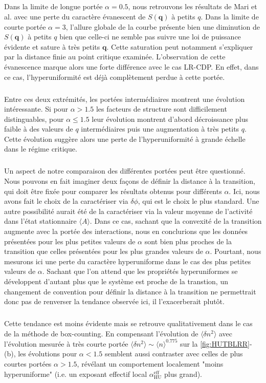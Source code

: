 \subparagraph{}Dans la limite de longue portée $\alpha = 0.5$, nous retrouvons les résultats de Mari et al. \cite{mari_absorbing_2022} avec une perte du caractère évanescent de $S(\mathbf{q})$ à petits $q$. Dans la limite de courte portée $\alpha = 3$, l'allure globale de la courbe présente bien une diminution de $S(\mathbf{q})$ à petits $q$ bien que celle-ci ne semble pas suivre une loi de puissance évidente et sature à très petits $\mathbf{q}$. Cette saturation peut notamment s'expliquer par la distance finie au point critique examinée. L'observation de cette évanescence marque alors une forte différence avec le cas LR-CDP. En effet, dans ce cas, l'hyperuniformité est déjà complètement perdue à cette portée.  

\subparagraph{}Entre ces deux extrémités, les portées intermédiaires montrent une évolution intéressante. Si pour $\alpha > 1.5$ les facteurs de structure sont difficilement distinguables, pour $\alpha \leq 1.5$ leur évolution montrent d'abord décroissance plus faible à des valeurs de $q$ intermédiaires puis une augmentation à très petits $q$. Cette évolution suggère alors une perte de l'hyperuniformité à grande échelle dans le régime critique.

\subparagraph{}Un aspect de notre comparaison des différentes portées peut être questionné. Nous pouvons en fait imaginer deux façons de définir la distance à la transition, qui doit être fixée pour comparer les résultats obtenus pour différents $\alpha$. Ici, nous avons fait le choix de la caractériser via $\delta\phi$, qui est le choix le plus standard. Une autre possibilité aurait été de la caractériser via la valeur moyenne de l'activité dans l'état stationnaire $\langle A \rangle$. Dans ce cas, sachant que la convexité de la transition augmente avec la portée des interactions, nous en conclurions que les données présentées pour les plus petites valeurs de $\alpha$ sont bien plus proches de la transition que celles présentées pour les  plus grandes valeurs de $\alpha$. Pourtant, nous mesurons ici une perte du caractère hyperuniforme dans le cas des plus petites valeurs de $\alpha$. Sachant que l'on attend que les propriétés hyperuniformes se développent d'autant plus que le système est proche de la transtion, un changement de convention pour définir la distance à la transition ne permettrait donc pas de renverser la tendance observée ici, il l'exacerberait plutôt.

\subparagraph{}Cette tendance est moins évidente  mais se retrouve qualitativement dans le cas de la méthode de box-counting. En compensant l'évolution de $\langle \delta n^2 \rangle$ avec l'évolution mesurée à très courte portée $\langle \delta n^2 \rangle \sim \langle n \rangle^{0.775}$ sur la \autoref{fig:HUTBLRR}-(b), les évolutions pour $\alpha<1.5$ semblent aussi contraster avec celles de plus courtes portées $\alpha>1.5$, révélant un comportement localement "moins hyperuniforme" (i.e. un exposant effectif local $\alpha_\text{HU}^\text{eff}$ plus grand).

